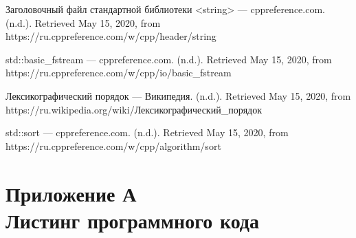 \documentclass[12pt,a4paper]{article}  %
\begin{document}
\begin{list}{[1]}{}
	\item Заголовочный файл стандартной библиотеки <string> — cppreference.com. (n.d.). Retrieved May 15, 2020, from https://ru.cppreference.com/w/cpp/header/string
\end{list}

\begin{list}{[2]}{}
	\item std::basic\_fstream — cppreference.com. (n.d.). Retrieved May 15, 2020, from https://ru.cppreference.com/w/cpp/io/basic\_fstream
\end{list}

\begin{list}{[3]}{}
	\item Лексикографический порядок — Википедия. (n.d.). Retrieved May 15, 2020, from https://ru.wikipedia.org/wiki/Лексикографический\_порядок
\end{list}

\begin{list}{[4]}{}
	\item std::sort — cppreference.com. (n.d.). Retrieved May 15, 2020, from https://ru.cppreference.com/w/cpp/algorithm/sort
\end{list}

\newpage
\section*{Приложение А\\ Листинг программного кода}
\setcounter{figure}{0}
\end{document}
